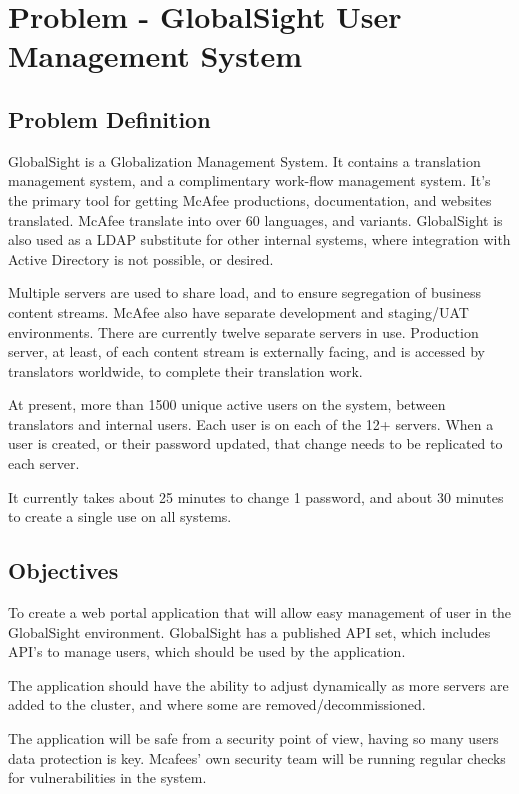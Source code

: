 \chapter{Problem - GlobalSight User Management System}
\label{chap:problem}

\section{Problem Definition}
GlobalSight is a Globalization Management System. It contains a translation management system, and a complimentary work-flow management system. It’s the primary tool for getting McAfee productions, documentation, and websites translated. McAfee translate into over 60 languages, and variants. GlobalSight is also used as a LDAP substitute for other internal systems, where integration with Active Directory is not possible, or desired.

Multiple servers are used to share load, and to ensure segregation of business content streams. McAfee also have separate development and staging/UAT environments. There are currently twelve separate servers in use. Production server, at least, of each content stream is externally facing, and is accessed by translators worldwide, to complete their translation work.

At present, more than 1500 unique active users on the system, between translators and internal users. Each user is on each of the 12+ servers. When a user is created, or their password
updated, that change needs to be replicated to each server.

It currently takes about 25 minutes to change 1 password, and about 30 minutes to create a single use on all systems.


\section{Objectives}
To create a web portal application that will allow easy management of user in the GlobalSight environment.  GlobalSight has a published API set, which includes API’s to manage users, which should be used by the application.

The application should have the ability to adjust dynamically as more servers are added to the cluster, and where some are removed/decommissioned. 

The application will be safe from a security point of view, having so many users data protection is key. Mcafees' own security team will be running regular checks for vulnerabilities in the system.

